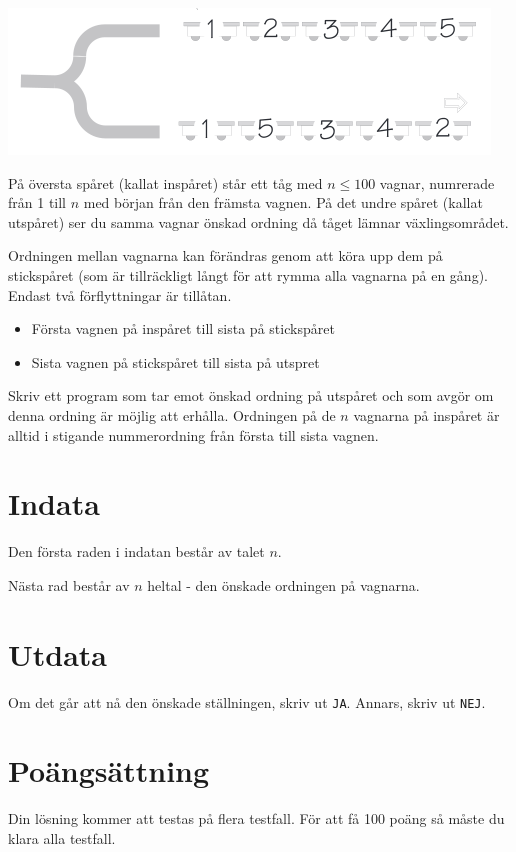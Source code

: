 
\includegraphics{tag.png}

På översta spåret (kallat inspåret) står ett tåg med $n \le 100$ vagnar, numrerade från 1 till $n$ med början från den främsta vagnen. På det undre spåret (kallat utspåret) ser du samma vagnar  önskad ordning då tåget lämnar växlingsområdet.

Ordningen mellan vagnarna kan förändras genom att köra upp dem på stickspåret (som är tillräckligt långt för att rymma alla vagnarna på en gång). Endast två förflyttningar är tillåtan.

\begin{itemize}
\item Första vagnen på inspåret till sista på stickspåret
\item Sista vagnen på stickspåret till sista på utspret
\end{itemize}
Skriv ett program som tar emot önskad ordning på utspåret och som avgör om denna ordning är möjlig att erhålla. Ordningen på de $n$ vagnarna på inspåret är alltid i stigande nummerordning från första till sista vagnen.

\section*{Indata}
Den första raden i indatan består av talet $n$.

Nästa rad består av $n$ heltal - den önskade ordningen på vagnarna.

\section*{Utdata}
Om det går att nå den önskade ställningen, skriv ut \texttt{JA}. Annars, skriv ut \texttt{NEJ}.


\section*{Poängsättning}
Din lösning kommer att testas på flera testfall. För att få 100 poäng så måste du klara alla testfall.

